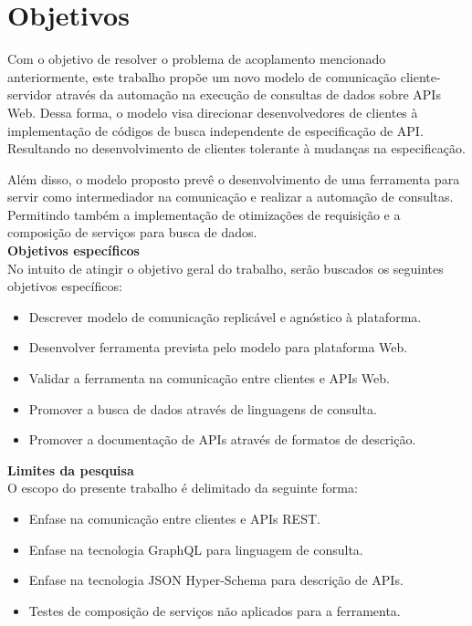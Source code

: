 \section[Objetivos]{Objetivos}

Com o objetivo de resolver o problema de acoplamento mencionado anteriormente, este trabalho propõe um novo modelo de comunicação cliente-servidor através da automação na execução de consultas de dados sobre APIs Web. Dessa forma, o modelo visa direcionar desenvolvedores de clientes à implementação de códigos de busca independente de especificação de API. Resultando no desenvolvimento de clientes tolerante à mudanças na especificação.

Além disso, o modelo proposto prevê o desenvolvimento de uma ferramenta para servir como intermediador na comunicação e realizar a automação de consultas. Permitindo também a implementação de otimizações de requisição e a composição de serviços para busca de dados. \\

\textbf{Objetivos específicos} \\

No intuito de atingir o objetivo geral do trabalho, serão buscados os seguintes objetivos específicos:

\begin{itemize}
\item Descrever modelo de comunicação replicável e agnóstico à plataforma.
\item Desenvolver ferramenta prevista pelo modelo para plataforma Web.
\item Validar a ferramenta na comunicação entre clientes e APIs Web.
\item Promover a busca de dados através de linguagens de consulta.
\item Promover a documentação de APIs através de formatos de descrição. \\
\end{itemize}

\textbf{Limites da pesquisa} \\

O escopo do presente trabalho é delimitado da seguinte forma:

\begin{itemize}
\item Enfase na comunicação entre clientes e APIs REST.
\item Enfase na tecnologia GraphQL para linguagem de consulta.
\item Enfase na tecnologia JSON Hyper-Schema para descrição de APIs.
\item Testes de composição de serviços não aplicados para a ferramenta.
\end{itemize}
